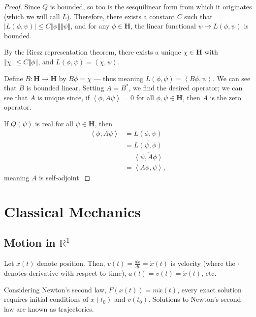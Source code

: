 \documentclass[10pt]{extarticle}
\newcommand{\R}{\mathbb{R}}
\newcommand{\iprod}[2]{\left\langle #1,#2\right\rangle}
\newcommand{\norm}[1]{\left\Vert #1\right\Vert}
\theoremstyle{plain}
\theoremstyle{definition}
\theoremstyle{remark}
\renewcommand{\newline}{\hfill\break}
\begin{document}
  \begin{proof}
    Since $Q$ is bounded, so too is the sesquilinear form from which it originates (which we will call $L$). Therefore, there exists a constant $C$ such that $\left\vert L(\phi,\psi) \right\vert\leq C\norm{\phi}\norm{\psi}$, and for any $\phi \in \mathbf{H}$, the linear functional $\psi \mapsto L(\phi,\psi)$ is bounded.\newline

    By the Riesz representation theorem, there exists a unique $\chi \in \mathbf{H}$ with $\norm{\chi} \leq C\norm{\phi}$, and $L(\phi,\psi) = \iprod{\chi}{\psi}$.\newline

    Define $B: \mathbf{H}\rightarrow \mathbf{H}$ by $B\phi = \chi$ --- thus meaning $L(\phi,\psi) = \iprod{B\phi}{\psi}$. We can see that $B$ is bounded linear. Setting $A = B^{\ast}$, we find the desired operator; we can see that $A$ is unique since, if $\iprod{\phi}{A\psi} = 0$ for all $\phi,\psi \in \mathbf{H}$, then $A$ is the zero operator.\newline

    If $Q(\psi)$ is real for all $\psi \in \mathbf{H}$, then
    \begin{align*}
      \iprod{\phi}{A\psi} &= L(\phi,\psi)\\
                          &= \overline{L(\psi,\phi)}\\
                          &= \overline{\iprod{\psi}{A\phi}}\\
                          &= \iprod{A\phi}{\psi},
    \end{align*}
    meaning $A$ is self-adjoint.
  \end{proof}
  \section{Classical Mechanics}%
  \subsection{Motion in $\R^{1}$}%
  Let $x(t)$ denote position. Then, $v(t) = \frac{dx}{dt} = \dot{x}(t)$ is velocity (where the $\cdot$ denotes derivative with respect to time), $a(t) = \dot{v}(t) = \ddot{x}(t)$, etc.\newline

  Considering Newton's second law, $F(x(t)) = m\ddot{x}(t)$, every exact solution requires initial conditions of $x(t_0)$ and $v(t_0)$. Solutions to Newton's second law are known as trajectories.\newline
\end{document}
